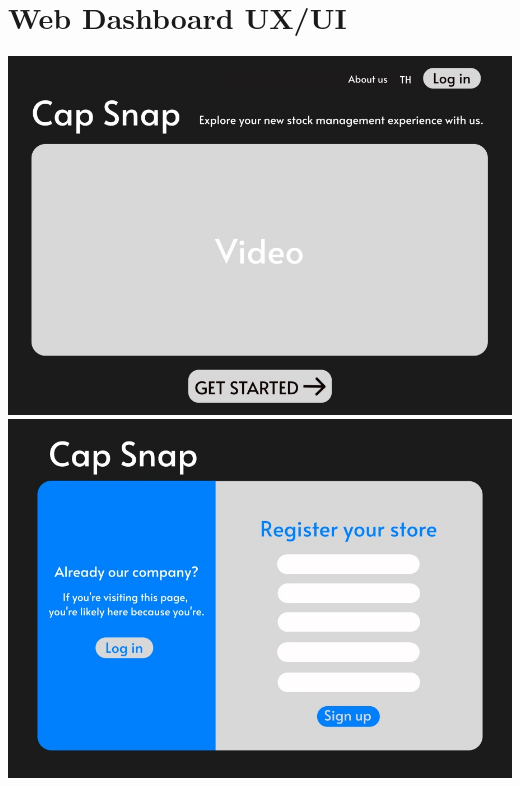 \section{Web Dashboard UX/UI}
{
\includegraphics[scale=0.9]{pic/ui/1.jpg}
\includegraphics[scale=0.9]{pic/ui/2.jpg}
}\\
